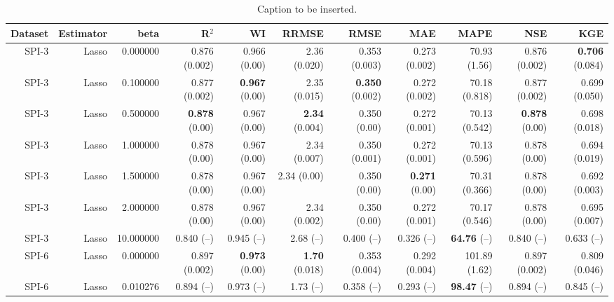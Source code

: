 \begin{table}
\centering
\caption{Caption to be inserted.}
\label{sp__comparison_datasets_table}
\begin{tabular}{rrrrrrrrrrr}
\toprule
Dataset & Estimator &      beta &                R$^2$ &                  WI &               RRMSE &                 RMSE &                  MAE &                  MAPE &                  NSE &                  KGE \\
\midrule
  SPI-3 &     Lasso &  0.000000 &        0.876 (0.002) &        0.966 (0.00) &        2.36 (0.020) &        0.353 (0.003) &        0.273 (0.002) &          70.93 (1.56) &        0.876 (0.002) & { \bf 0.706} (0.084) \\
  SPI-3 &     Lasso &  0.100000 &        0.877 (0.002) & { \bf 0.967} (0.00) &        2.35 (0.015) & { \bf 0.350} (0.002) &        0.272 (0.002) &         70.18 (0.818) &        0.877 (0.002) &        0.699 (0.050) \\
  SPI-3 &     Lasso &  0.500000 &  { \bf 0.878} (0.00) &        0.967 (0.00) & { \bf 2.34} (0.004) &         0.350 (0.00) &        0.272 (0.001) &         70.13 (0.542) &  { \bf 0.878} (0.00) &        0.698 (0.018) \\
  SPI-3 &     Lasso &  1.000000 &         0.878 (0.00) &        0.967 (0.00) &        2.34 (0.007) &        0.350 (0.001) &        0.272 (0.001) &         70.13 (0.596) &         0.878 (0.00) &        0.694 (0.019) \\
  SPI-3 &     Lasso &  1.500000 &         0.878 (0.00) &        0.967 (0.00) &         2.34 (0.00) &         0.350 (0.00) &  { \bf 0.271} (0.00) &         70.31 (0.366) &         0.878 (0.00) &        0.692 (0.003) \\
  SPI-3 &     Lasso &  2.000000 &         0.878 (0.00) &        0.967 (0.00) &        2.34 (0.002) &         0.350 (0.00) &        0.272 (0.001) &         70.17 (0.546) &         0.878 (0.00) &        0.695 (0.007) \\
  SPI-3 &     Lasso & 10.000000 &           0.840 (--) &          0.945 (--) &           2.68 (--) &           0.400 (--) &           0.326 (--) &     { \bf 64.76} (--) &           0.840 (--) &           0.633 (--) \\
  SPI-6 &     Lasso &  0.000000 &        0.897 (0.002) & { \bf 0.973} (0.00) & { \bf 1.70} (0.018) &        0.353 (0.004) &        0.292 (0.004) &         101.89 (1.62) &        0.897 (0.002) &        0.809 (0.046) \\
  SPI-6 &     Lasso &  0.010276 &           0.894 (--) &          0.973 (--) &           1.73 (--) &           0.358 (--) &           0.293 (--) &     { \bf 98.47} (--) &           0.894 (--) &           0.845 (--) \\

\end{tabular}
\end{table}
